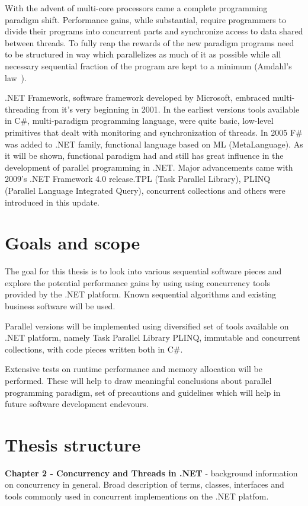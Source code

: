 With the advent of multi-core processors came a complete programming paradigm shift. Performance gains, while substantial, require programmers to divide their programs into concurrent parts and synchronize access to data shared between threads. To fully reap the rewards of the new paradigm programs need to be structured in way which parallelizes as much of it as possible while all necessary sequential fraction of the program are kept to a minimum (Amdahl's law~\cite{Amdahl1967}).

.NET Framework, software framework developed by Microsoft, embraced multi-threading from it's very beginning in 2001.
In the earliest versions tools available in C\#, multi-paradigm programming language,  were quite basic, low-level primitives that dealt with monitoring and synchronization of threads. In 2005 F\# was added to .NET family, functional language based on ML (MetaLanguage). As it will be shown, functional paradigm had and still has great influence in the development of parallel programming in .NET. Major advancements came with 2009's .NET Framework 4.0 release.TPL (Task Parallel Library), PLINQ (Parallel Language Integrated Query), concurrent collections and others were introduced in this update. 


\section{Goals and scope}

The goal for this thesis is to look into various sequential software pieces
and explore the potential performance gains by using using concurrency tools 
provided by the .NET platform. Known sequential algorithms and existing business software will be used.

Parallel versions will be implemented using diversified set of tools available on .NET platform, namely
Task Parallel Library PLINQ, immutable and concurrent collections, with code pieces written both
in C\#.

Extensive tests on runtime performance and memory allocation will be performed. 
These will help to draw meaningful conclusions about parallel programming paradigm, set of precautions
and guidelines which will help in future software development endevours. 

\section{Thesis structure}
\textbf{Chapter 2 - Concurrency and Threads in .NET} -  background information on concurrency in general. 
Broad description of terms, classes, interfaces and tools commonly used in concurrent implementions on the .NET platfom.

